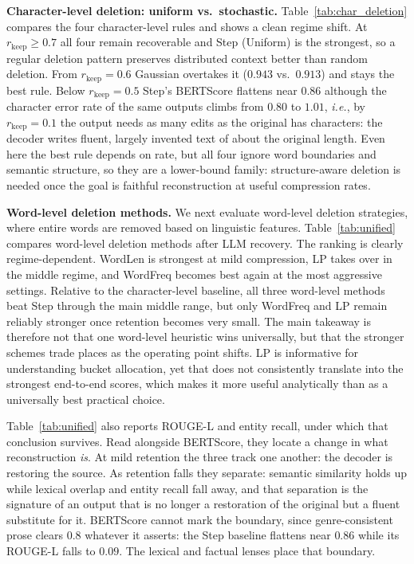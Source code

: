 \documentclass[11pt]{article}
\newcommand{\rkeep}{r_{\mathrm{keep}}}
\begin{document}
\textbf{Character-level deletion: uniform vs.\ stochastic.} Table~\ref{tab:char_deletion} compares the four character-level rules and shows a clean regime shift. At $\rkeep \ge 0.7$ all four remain recoverable and Step (Uniform) is the strongest, so a regular deletion pattern preserves distributed context better than random deletion. From $\rkeep = 0.6$ Gaussian overtakes it ($0.943$ vs.\ $0.913$) and stays the best rule. Below $\rkeep = 0.5$ Step's BERTScore flattens near $0.86$ although the character error rate of the same outputs climbs from $0.80$ to $1.01$, {\em i.e.}, by $\rkeep = 0.1$ the output needs as many edits as the original has characters: the decoder writes fluent, largely invented text of about the original length. Even here the best rule depends on rate, but all four ignore word boundaries and semantic structure, so they are a lower-bound family: structure-aware deletion is needed once the goal is faithful reconstruction at useful compression rates.

\textbf{Word-level deletion methods.}
We next evaluate word-level deletion strategies, where
entire words are removed based on linguistic features.
Table~\ref{tab:unified} compares word-level deletion methods after LLM recovery.
The ranking is clearly regime-dependent. WordLen is strongest at mild compression, LP takes over in the middle regime, and WordFreq becomes best again at the most aggressive settings. Relative to the character-level baseline, all three word-level methods beat Step through the main middle range, but only WordFreq and LP remain reliably stronger once retention becomes very small. The main takeaway is therefore not that one word-level heuristic wins universally, but that the stronger schemes trade places as the operating point shifts. LP is informative for understanding bucket allocation, yet that does not consistently translate into the strongest end-to-end scores, which makes it more useful analytically than as a universally best practical choice.

Table~\ref{tab:unified} also reports ROUGE-L and entity recall, under which that conclusion survives. Read
alongside BERTScore, they locate a change in what reconstruction \emph{is}. At mild retention the
three track one another: the decoder is restoring the source. As retention falls they separate: semantic similarity holds up while lexical overlap and entity recall fall away, and that separation is the
signature of an output that is no longer a restoration of the original but a fluent substitute for it.
BERTScore cannot mark the boundary, since genre-consistent prose clears $0.8$ whatever it asserts: the Step
baseline flattens near $0.86$ while its ROUGE-L falls to $0.09$. The lexical and factual
lenses place that boundary.
\end{document}
